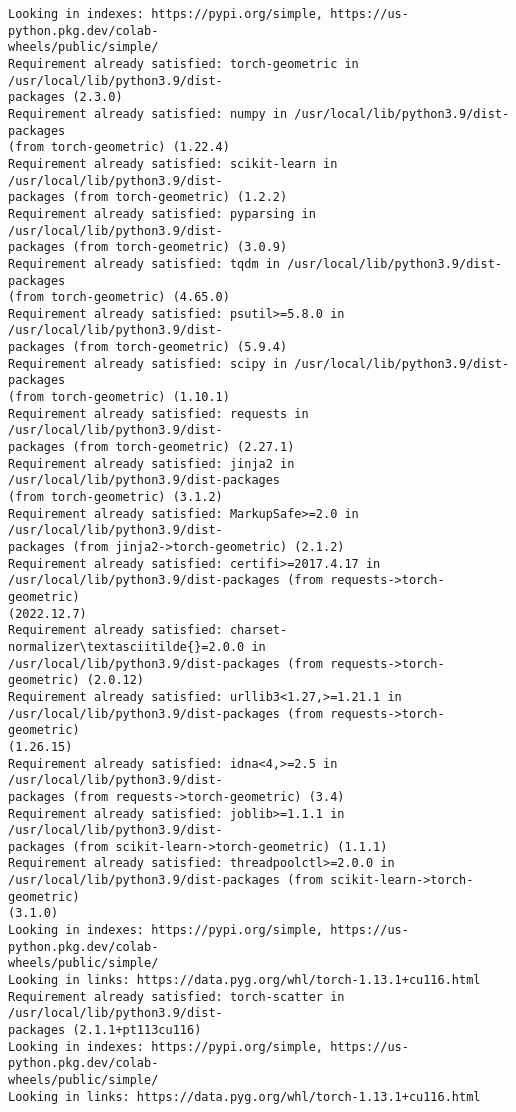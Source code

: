 \documentclass[11pt]{article}
\begin{document}
    \begin{Verbatim}[commandchars=\\\{\}]
Looking in indexes: https://pypi.org/simple, https://us-python.pkg.dev/colab-
wheels/public/simple/
Requirement already satisfied: torch-geometric in /usr/local/lib/python3.9/dist-
packages (2.3.0)
Requirement already satisfied: numpy in /usr/local/lib/python3.9/dist-packages
(from torch-geometric) (1.22.4)
Requirement already satisfied: scikit-learn in /usr/local/lib/python3.9/dist-
packages (from torch-geometric) (1.2.2)
Requirement already satisfied: pyparsing in /usr/local/lib/python3.9/dist-
packages (from torch-geometric) (3.0.9)
Requirement already satisfied: tqdm in /usr/local/lib/python3.9/dist-packages
(from torch-geometric) (4.65.0)
Requirement already satisfied: psutil>=5.8.0 in /usr/local/lib/python3.9/dist-
packages (from torch-geometric) (5.9.4)
Requirement already satisfied: scipy in /usr/local/lib/python3.9/dist-packages
(from torch-geometric) (1.10.1)
Requirement already satisfied: requests in /usr/local/lib/python3.9/dist-
packages (from torch-geometric) (2.27.1)
Requirement already satisfied: jinja2 in /usr/local/lib/python3.9/dist-packages
(from torch-geometric) (3.1.2)
Requirement already satisfied: MarkupSafe>=2.0 in /usr/local/lib/python3.9/dist-
packages (from jinja2->torch-geometric) (2.1.2)
Requirement already satisfied: certifi>=2017.4.17 in
/usr/local/lib/python3.9/dist-packages (from requests->torch-geometric)
(2022.12.7)
Requirement already satisfied: charset-normalizer\textasciitilde{}=2.0.0 in
/usr/local/lib/python3.9/dist-packages (from requests->torch-geometric) (2.0.12)
Requirement already satisfied: urllib3<1.27,>=1.21.1 in
/usr/local/lib/python3.9/dist-packages (from requests->torch-geometric)
(1.26.15)
Requirement already satisfied: idna<4,>=2.5 in /usr/local/lib/python3.9/dist-
packages (from requests->torch-geometric) (3.4)
Requirement already satisfied: joblib>=1.1.1 in /usr/local/lib/python3.9/dist-
packages (from scikit-learn->torch-geometric) (1.1.1)
Requirement already satisfied: threadpoolctl>=2.0.0 in
/usr/local/lib/python3.9/dist-packages (from scikit-learn->torch-geometric)
(3.1.0)
Looking in indexes: https://pypi.org/simple, https://us-python.pkg.dev/colab-
wheels/public/simple/
Looking in links: https://data.pyg.org/whl/torch-1.13.1+cu116.html
Requirement already satisfied: torch-scatter in /usr/local/lib/python3.9/dist-
packages (2.1.1+pt113cu116)
Looking in indexes: https://pypi.org/simple, https://us-python.pkg.dev/colab-
wheels/public/simple/
Looking in links: https://data.pyg.org/whl/torch-1.13.1+cu116.html

\end{Verbatim}
\end{document}
